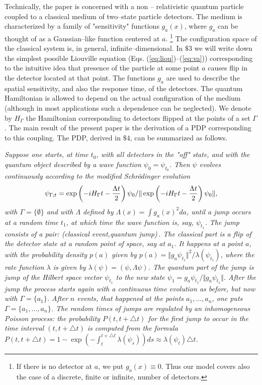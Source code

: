 \documentclass[12pt]{article}
\begin{document}
Technically, the paper is concerned with a non -- relativistic quantum
particle coupled to a classical medium of two--state particle detectors.
The medium is characterized by a family of "sensitivity" functions
$g_a(x)$, where $g_a$ can be thought of as a Gaussian--like function
centered at $a$. \footnote{If there is no detector at $a$, we put
$g_a(x)\equiv0$. Thus our model covers also the case of a discrete, finite
or infinite, number of detectors.} The configuration space of the classical
system is, in general, infinite--dimensional. In $\$ 3$ we will write down
the simplest possible Liouville equation (Eqs.
(\ref{eq:liou})--(\ref{eq:va})) corresponding to the intuitive idea that
presence of the particle at some point $a$ causes flip in the detector
located at that point. The functions $g_a$ are used to describe the spatial
sensitivity, and also the response time, of the detectors. The quantum
Hamiltonian is allowed to depend on the actual configuration of the medium
(although in most applications such a dependence can be neglected). We
denote by $H_\Gamma$ the Hamiltonian corresponding to detectors flipped at
the points of a set $\Gamma$. The main result of the present paper is the
derivation of a PDP corresponding to this coupling. The PDP, derived in $\$
4$, can be summarized as follows.

\medskip
{\sl Suppose one starts, at time $t_0$, with all detectors in the "off"
state, and with the quantum object described by a wave function $\psi
_0=\psi_{t_0}$. Then $\psi$ evolves continuously according to the modified
Schr\"odinger evolution
$$\psi_{\Gamma;t}=\exp\left(-iH_\Gamma t-{{\Lambda t}\over 2}\right)\psi_0
/{\Vert \exp\left(-iH_\Gamma t-{{\Lambda t}\over 2}\right)\psi_0\Vert},$$
with $\Gamma=\{\emptyset \}$ and with $\Lambda$ defined by $\Lambda
(x)=\int g_a(x)^2 da$, until a jump occurs at a random time $t_1$, at which
time the wave function is, say, $\psi_{t_1}$. The jump consists of a pair:
{\sl (classical event,quantum jump)}\,. The classical part is a flip of the
detector state at a random point of space, say at $a_1$. It happens at a
point $a$, with the probability density $p(a)$ given by  $p(a)=\Vert g_a
\psi_{t_1}\Vert^2/\lambda(\psi_{t_1})$,
where the rate function $\lambda$ is given by
$\lambda(\psi)=(\psi,\Lambda\psi)$. The quantum part of the jump is jump of
the Hilbert space vector $\psi_{t_1}$ to the new state
$\psi_1=g_{a}\psi_{t_1}/{\Vert g_{a}\psi_{t_1}\Vert}$. After the jump the
process starts again with a continuous time evolution as before, but now
with $\Gamma=\{a_1\}$. After $n$ events, that happened at the points
$a_1,\ldots ,a_n$, one puts $\Gamma=\{a_1,\ldots ,a_n\}$. The random times
of jumps are regulated by an inhomogeneous Poisson process: the probability
$P(t,t+\triangle t)$ for the first jump to occur in the time interval
$(t,t+\triangle t)$ is computed from the formula
$P(t,t+\triangle t)=1-\exp \left(-\int_t^{t+\triangle t}
\lambda(\psi_s)\right)ds\approx \lambda(\psi_t)\triangle t$.}
\medskip
\end{document}
